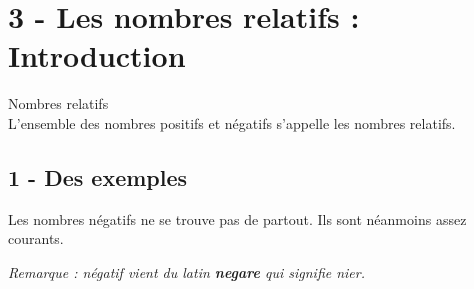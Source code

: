 



\section*{3 - Les nombres relatifs : Introduction}

\begin{Definition}{Nombres relatifs}\\
  L'ensemble des nombres positifs et négatifs s'appelle les nombres relatifs.
\end{Definition}

\subsection*{1 - Des exemples}

Les nombres négatifs ne se trouve pas de partout. Ils sont néanmoins assez courants.

\textit{Remarque : négatif vient du latin \textbf{negare} qui signifie nier.}

